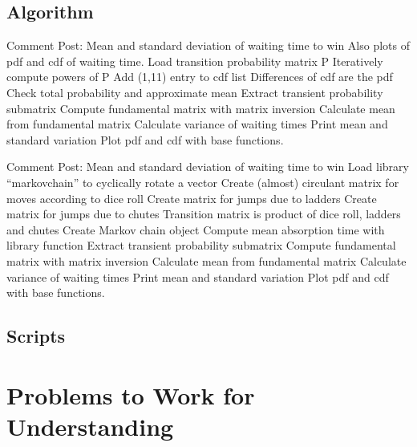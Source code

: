 \documentclass[12pt]{article}
\begin{document}
\subsection*{Algorithm}

\begin{codebox}
  \zi Comment Post: Mean and standard deviation of waiting time to win
  \zi Also plots of pdf and cdf of waiting time.
  \li Load transition probability matrix P
  \zi
  \li Iteratively compute powers of P
  \li Add (1,11) entry to cdf list
  \zi
  \li Differences of cdf are the pdf
  \zi
  \li Check total probability and approximate mean
  \zi
  \li Extract transient probability submatrix
  \li Compute fundamental matrix with matrix inversion
  \zi
  \li Calculate mean from fundamental matrix
  \li Calculate variance of waiting times
  \li Print mean and standard variation
  \zi
  \li Plot pdf and cdf with base functions.
\end{codebox}

\begin{codebox}
  \zi Comment Post: Mean and standard deviation of waiting time to win
  \li Load library ``markovchain''
  \li {} to cyclically rotate a vector
  \li Create (almost) circulant matrix for moves according to dice roll
  \li Create matrix for jumps due to ladders
  \li Create matrix for jumps due to chutes
  \li Transition matrix is product of dice roll, ladders and chutes
  \zi
  \li Create Markov chain object
  \li Compute mean absorption time with library function
  \zi
  \li Extract transient probability submatrix
  \li Compute fundamental matrix with matrix inversion
  \zi
  \li Calculate mean from fundamental matrix
  \li Calculate variance of waiting times
  \li Print mean and standard variation
  \zi
  \li Plot pdf and cdf with base functions.
\end{codebox}

\subsection*{Scripts}



\hr

\section*{Problems to Work for Understanding}
\end{document}
